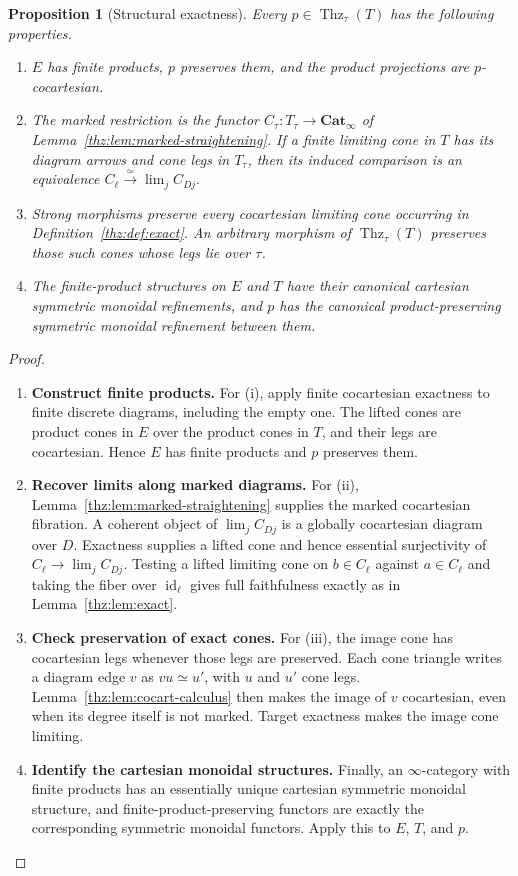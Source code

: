 \documentclass[oneside]{article}
\theoremstyle{plain}
\newtheorem{proposition}[theorem]{Proposition}
\theoremstyle{definition}
\theoremstyle{remark}
\newcommand{\Cat}{\mathbf{Cat}_{\infty}}
\newcommand{\Thz}{\operatorname{Thz}}
\newcommand{\id}{\operatorname{id}}
\begin{document}
\begin{proposition}[Structural exactness]\label{thz:prop:structural}
Every $p\in\Thz_\tau(T)$ has the following properties.
\begin{enumerate}\renewcommand{\labelenumi}{(\roman{enumi})}
\item $E$ has finite products, $p$ preserves them, and the product
      projections are $p$-cocartesian.
\item The marked restriction is the functor
      $C_\tau:T_\tau\to\Cat$ of
      Lemma~\ref{thz:lem:marked-straightening}.  If a finite limiting
      cone in $T$ has its diagram arrows and cone legs in $T_\tau$, then
      its induced comparison is an equivalence
 $C_\ell\xrightarrow{\simeq}\lim_jC_{Dj}.$ \item Strong morphisms preserve every cocartesian limiting cone occurring
      in Definition~\ref{thz:def:exact}.  An arbitrary morphism of
      $\Thz_\tau(T)$ preserves those such cones whose legs lie over
      $\tau$.
\item The finite-product structures on $E$ and $T$ have their canonical
      cartesian symmetric monoidal refinements, and $p$ has the canonical
      product-preserving symmetric monoidal refinement between them.
\end{enumerate}
\end{proposition}
\begin{proof}
\leavevmode
\begin{enumerate}
\item \textbf{Construct finite products.} For (i), apply finite cocartesian exactness to finite discrete diagrams,
including the empty one.  The lifted cones are product cones in $E$ over
the product cones in $T$, and their legs are cocartesian.  Hence $E$ has
finite products and $p$ preserves them.
\item \textbf{Recover limits along marked diagrams.} For (ii), Lemma~\ref{thz:lem:marked-straightening} supplies the marked
cocartesian fibration.  A coherent object of $\lim_jC_{Dj}$ is a globally
cocartesian diagram over $D$.  Exactness supplies a lifted cone and hence
essential surjectivity of $C_\ell\to\lim_jC_{Dj}$.  Testing a lifted
limiting cone on $b\in C_\ell$ against $a\in C_\ell$ and taking the fiber
over $\id_\ell$ gives full faithfulness exactly as in
Lemma~\ref{thz:lem:exact}.
\item \textbf{Check preservation of exact cones.} For (iii), the image cone has cocartesian legs whenever those legs are
preserved.  Each cone triangle writes a diagram edge $v$ as
$vu\simeq u'$, with $u$ and $u'$ cone legs.  Lemma~\ref{thz:lem:cocart-calculus}
then makes the image of $v$ cocartesian, even when its degree itself is not
marked.  Target exactness makes the image cone limiting.
\item \textbf{Identify the cartesian monoidal structures.} Finally, an $\infty$-category with finite products has an essentially
unique cartesian symmetric monoidal structure, and finite-product-preserving
functors are exactly the corresponding symmetric monoidal functors.  Apply
this to $E$, $T$, and $p$.\cite[Cor.~2.4.1.9]{LurieHA}\qedhere
\end{enumerate}
\end{proof}
\end{document}
